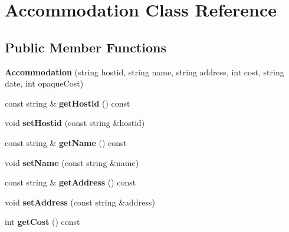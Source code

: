 \hypertarget{class_accommodation}{}\section{Accommodation Class Reference}
\label{class_accommodation}
\subsection*{Public Member Functions}
\begin{DoxyCompactItemize}
\item 
\mbox{\label{class_accommodation_a486de6669daa47ce1a8929f410b49c5f}} 
{\bfseries Accommodation} (string hostid, string name, string address, int cost, string date, int opaque\+Cost)
\item 
\mbox{\label{class_accommodation_a4621587884589f6f4e2a96d9ea6a2b6e}} 
const string \& {\bfseries get\+Hostid} () const
\item 
\mbox{\label{class_accommodation_a5c304670c0dc1dbd798a78613e0b3517}} 
void {\bfseries set\+Hostid} (const string \&hostid)
\item 
\mbox{\label{class_accommodation_a3a9149223a98b52d81d75e3a996c763e}} 
const string \& {\bfseries get\+Name} () const
\item 
\mbox{\label{class_accommodation_abce7026c22122eb871712ca5e25c5d5c}} 
void {\bfseries set\+Name} (const string \&name)
\item 
\mbox{\label{class_accommodation_ac76a72fca22b2a44de424c8dcdd27591}} 
const string \& {\bfseries get\+Address} () const
\item 
\mbox{\label{class_accommodation_a54955b147de1f2010e3c5e9c7c5c9d5b}} 
void {\bfseries set\+Address} (const string \&address)
\item 
\mbox{\label{class_accommodation_a04dffb4cb999d398751914e2aa21d481}} 
int {\bfseries get\+Cost} () const
\item 
\mbox{\label{class_accommodation_a126485fdd60120667ea84dbd67c01021}} 

\end{DoxyCompactItemize}
